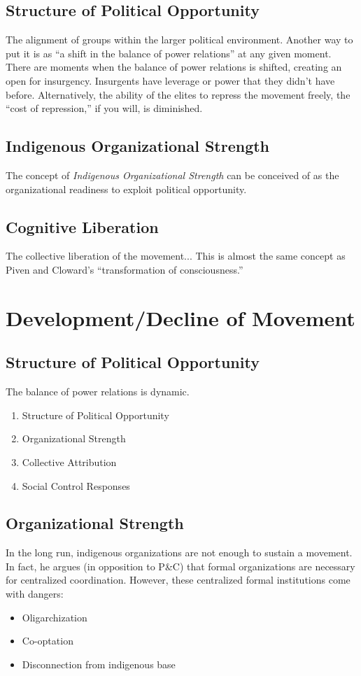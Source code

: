 \subsection{Structure of Political Opportunity}
The alignment of groups within the larger political environment.
Another way to put it is as  ``a shift in the balance of power relations'' at any given moment.
There are moments when the balance of power relations is shifted, creating an open for insurgency.
Insurgents have leverage or power that they didn't have before.
Alternatively, the ability of the elites to repress the movement freely, the ``cost of repression,'' if you will, is diminished.

\subsection{Indigenous Organizational Strength}
The concept of \textit{Indigenous Organizational Strength} can be conceived of as the organizational readiness to exploit political opportunity.


\subsection{Cognitive Liberation}
The collective liberation of the movement...
This is almost the same concept as Piven and Cloward's ``transformation of consciousness.''

\section{Development/Decline of Movement}

\subsection{Structure of Political Opportunity}
The balance of power relations is dynamic.
\begin{enumerate}
    \item Structure of Political Opportunity
    \item Organizational Strength
    \item Collective Attribution
    \item Social Control Responses
\end{enumerate}

\subsection{Organizational Strength}
In the long run, indigenous organizations are not enough to sustain a movement.
In fact, he argues (in opposition to P\&C) that formal organizations are necessary for centralized coordination.
However, these centralized formal institutions come with dangers:
\begin{itemize}
    \item Oligarchization
    \item Co-optation
    \item Disconnection from indigenous base
\end{itemize}


